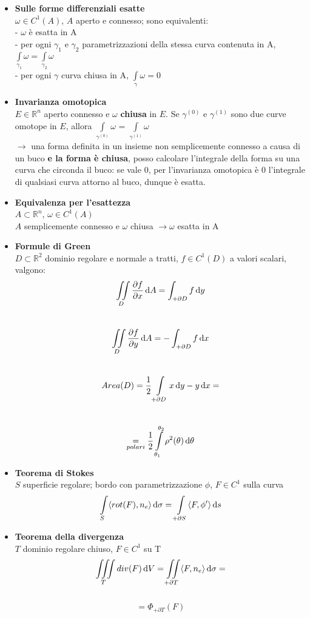 \documentclass[a4paper,portrait,columns=3,5pt]{cheatsheet}
\begin{document}
\begin{itemize}
	\item \textbf{Sulle forme differenziali esatte}\\
			$\omega \in C^1(A)$, $A$ aperto e connesso; sono equivalenti:\\
				- $\omega$ è esatta in A\\
				- per ogni $\gamma_1$ e $\gamma_2$ parametrizzazioni della stessa curva contenuta in A, 
					$\int\limits_{\gamma_1} \omega = \int\limits_{\gamma_2}\omega$\\
				- per ogni $\gamma$ curva chiusa in A, $\int\limits_\gamma \omega = 0$
	\item \textbf{Invarianza omotopica}\\
		$E \in \mathbb{R}^n$ aperto connesso e $\omega$ \textbf{chiusa} in $E$. Se $\gamma^{(0)}$ e $\gamma^{(1)}$ sono due curve omotope in $E$, allora $\int\limits_{\gamma^{(0)}} \omega$ = $\int\limits_{\gamma^{(1)}} \omega$ \\
		$\to$ una forma definita in un insieme non semplicemente connesso a causa di un buco \textbf{e la forma è chiusa}, posso calcolare l'integrale della forma su una curva che circonda il buco: se vale 0, per l'invarianza omotopica è 0 l'integrale di qualsiasi curva attorno al buco, dunque è esatta.
	
	\item \textbf{Equivalenza per l'esattezza}\\
			$A\subset \mathbb{R}^n$, $\omega \in C^1(A)$\\ $A$ semplicemente connesso e $\omega$ chiusa $\to \omega$ esatta in A
	\item \textbf{Formule di Green}\\
			$D \subset \mathbb{R}^2$ dominio regolare e normale a tratti, $f \in C^1(D)$ a valori scalari, valgono:\\
			 $$\iint\limits_D\dfrac{\partial f}{\partial x} \dif A = \int_{+\partial D} f \dif y$$\\
			$$\iint\limits_D \dfrac{\partial f}{\partial y} \dif A = -\int_{+\partial D} f \dif x$$\\
			$$ Area(D) = \frac{1}{2} \int\limits_{+\partial D} x\dif y - y\dif x = $$ \\
			 $$ \underset{polari}{=} \frac{1}{2}\int\limits_{\theta_1}^{\theta_2} \rho^2(\theta) \dif \theta$$
	\item \textbf{Teorema di Stokes}\\ 
			$S$ superficie regolare; bordo con parametrizzazione $\phi$, $F \in C^1$ sulla curva 
			$$ \int\limits_S \langle rot(F), n_e \rangle \dif \sigma = \int\limits_{+\partial S}\langle F, \phi ' \rangle \dif s$$ 
	\item \textbf{Teorema della divergenza}\\
			$T$ dominio regolare chiuso, $F \in C^1$ su T
			$$ \iiint\limits_T div(F) \dif V = \iint\limits_{+\partial T} \langle F, n_e \rangle \dif \sigma =$$ \\
			$$ = \Phi_{+\partial T}(F)$$
\end{itemize}
\end{document}
